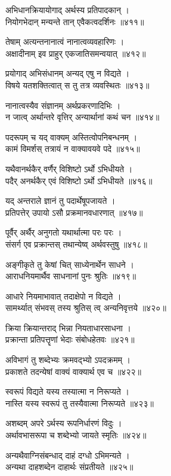 अभिधानक्रियायोगाद् अर्थस्य प्रतिपादकान् ।\\नियोगभेदान् मन्यन्ते तान् एवैकत्वदर्शिनः ॥४११॥

तेषाम् अत्यन्तनानात्वं नानात्वव्यवहारिणः ।\\अक्षादीनाम् इव प्राहुर् एकजातिसमन्वयात् ॥४१२॥

प्रयोगाद् अभिसंधानम् अन्यद् एषु न विद्यते ।\\विषये यतशक्तित्वात् स तु तत्र व्यवस्थितः ॥४१३॥

नानात्वस्यैव संज्ञानम् अर्थप्रकरणादिभिः ।\\न जात्व् अर्थान्तरे वृत्तिर् अन्यार्थानां कथं चन ॥४१४॥

पदरूपम् च यद् वाक्यम् अस्तित्वोपनिबन्धनम् ।\\कामं विमर्शस् तत्रायं न वाक्यावयवे पदे ॥४१५॥

यथैवानर्थकैर् वर्णैर् विशिष्टो ऽर्थो ऽभिधीयते ।\\पदैर् अनर्थकैर् एवं विशिष्टो ऽर्थो ऽभिधीयते ॥४१६॥

यद् अन्तराले ज्ञानं तु पदार्थेषूपजायते ।\\प्रतिपत्तेर् उपायो ऽसौ प्रक्रमानवधारणात् ॥४१७॥

पूर्वैर् अर्थैर् अनुगतो यथार्थात्मा परः परः ।\\संसर्ग एव प्रक्रान्तस् तथान्येष्व् अर्थवस्तुषु ॥४१८॥

अङ्गीकृते तु केषां चित् साध्येनार्थेन साधने ।\\आराधनियमार्थैव साधनानां पुनः श्रुतिः ॥४१९॥

आधारे नियमाभावात् तदाक्षेपो न विद्यते ।\\सामर्थ्यात् संभवस् तस्य श्रुतिस् त्व् अन्यनिवृत्तये ॥४२०॥

क्रिया क्रियान्तराद् भिन्ना नियताधारसाधना ।\\प्रक्रान्ता प्रतिपत्तॄणां भेदाः संबोधहेतवः ॥४२१॥

अविभागं तु शब्देभ्यः क्रमवद्भ्यो ऽपदक्रमम् ।\\प्रकाशते तदन्येषां वाक्यं वाक्यार्थ एव च ॥४२२॥

स्वरूपं विद्यते यस्य तस्यात्मा न निरूप्यते ।\\नास्ति यस्य स्वरूपं तु तस्यैवात्मा निरूप्यते ॥४२३॥

अशब्दम् अपरे ऽर्थस्य रूपनिर्धारणं विदुः ।\\अर्थावभासरूपा च शब्देभ्यो जायते स्मृतिः ॥४२४॥

अन्यथैवाग्निसंबन्धाद् दाहं दग्धो ऽभिमन्यते ।\\अन्यथा दाहशब्देन दाहार्थः संप्रतीयते ॥४२५॥

